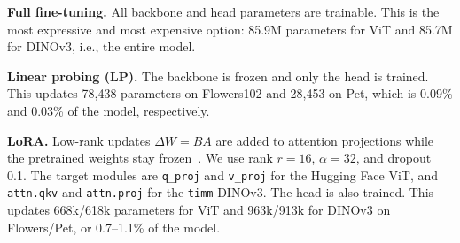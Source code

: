 \documentclass[journal,11pt]{IEEEtran}
\begin{document}
\begin{table}[!htbp]
\caption{Yes/no summary of the five strategies. ``Yes'' marks components that the optimizer updates (NCM computes class prototypes instead); ``No'' marks frozen or unused components. ``Backbone biases'' excludes the classifier head, and parameter ranges span both backbones and datasets.}
\label{tab:strategies}
\centering
\footnotesize
\setlength{\tabcolsep}{5pt}
\end{table}

\textbf{Full fine-tuning.} All backbone and head parameters are trainable. This is the most expressive and most expensive option: 85.9M parameters for ViT and 85.7M for DINOv3, i.e., the entire model.

\textbf{Linear probing (LP).} The backbone is frozen and only the head is trained. This updates 78{,}438 parameters on Flowers102 and 28{,}453 on Pet, which is 0.09\% and 0.03\% of the model, respectively.

\textbf{LoRA.} Low-rank updates $\Delta W = BA$ are added to attention projections while the pretrained weights stay frozen~\cite{hu2022lora}. We use rank $r=16$, $\alpha=32$, and dropout 0.1. The target modules are \texttt{q\_proj} and \texttt{v\_proj} for the Hugging Face ViT, and \texttt{attn.qkv} and \texttt{attn.proj} for the \texttt{timm} DINOv3. The head is also trained. This updates 668k/618k parameters for ViT and 963k/913k for DINOv3 on Flowers/Pet, or 0.7--1.1\% of the model.
\end{document}
